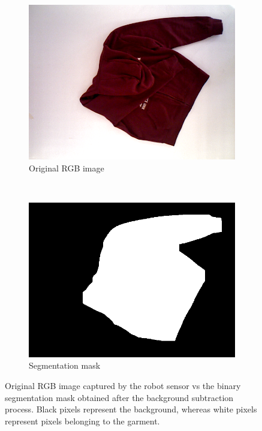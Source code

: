 \begin{figure}[htbp]
	\centering
    \begin{subfigure}[l]{0.49\textwidth}
	    \centering
    	\includegraphics[width=\textwidth]
    	{figures/segmentation_original.png}
    	\caption{Original RGB image}
	\end{subfigure}
	~
    \begin{subfigure}[r]{0.49\textwidth}
	    \centering
    	\includegraphics[width=\textwidth]
    	{figures/segmentation_mask.png}
    	\caption{Segmentation mask}
	\end{subfigure} 
    \caption{Original RGB image captured by the robot sensor vs the binary segmentation mask obtained after the background subtraction process. Black pixels represent the background, whereas white pixels represent pixels belonging to the garment.}
    \label{fig:segmentation_mask}
\end{figure}



